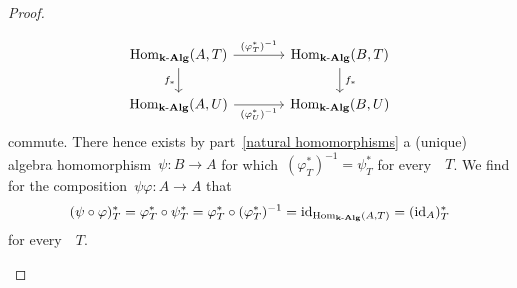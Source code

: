 \begin{proof}
\begin{enumerate}
      \[
        \begin{tikzcd}[column sep = large]
          \Hom_{\cAlg{\kf}}(A,T)
          \arrow{r}[above]{ (\varphi^*_T)^{-1} }
          \arrow{d}[left]{f_*}
          &
          \Hom_{\cAlg{\kf}}(B,T)
          \arrow{d}[right]{\spacing f_*}
          \\
          \Hom_{\cAlg{\kf}}(A,U)
          \arrow{r}[below]{ (\varphi^*_U)^{-1} }
          &
          \Hom_{\cAlg{\kf}}(B,U)
        \end{tikzcd}
      \]
      commute.
      There hence exists by part~\ref*{natural homomorphisms} a (unique) algebra homomorphism~$\psi \colon B \to A$ for which~$(\varphi^*_T)^{-1} = \psi^*_T$ for every~{\algebra{$\kf$}}~$T$.
      We find for the composition~$\psi \varphi \colon A \to A$ that
      \[
        (\psi \circ \varphi)^*_T
        =
        \varphi^*_T \circ \psi^*_T
        =
        \varphi^*_T \circ (\varphi^*_T)^{-1}
        =
        \operatorname{id}_{\operatorname{Hom}_{\mathbf{k}\text{-}\mathbf{Alg}}(A,T)}
        =
        (\operatorname{id}_A)^*_T
      \]
      for every~{\algebra{$\kf$}}~$T$.

\end{enumerate}
\end{proof}

